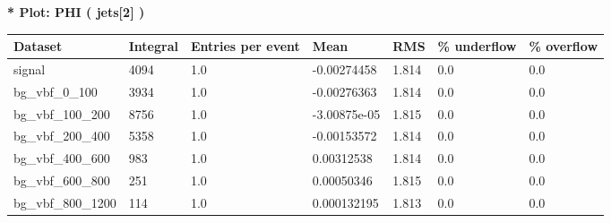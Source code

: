 \documentclass[a4paper, 10pt]{article}
\begin{document}
\textbf{* Plot: PHI ( jets[2] ) }\\
   \begin{table}[H]
  \begin{center}
    \begin{tabular}{|m{23.0mm}|m{23.0mm}|m{18.0mm}|m{19.0mm}|m{19.0mm}|m{19.0mm}|m{19.0mm}|}
      \hline
      {\cellcolor{yellow}         Dataset}& {\cellcolor{yellow}         Integral}& {\cellcolor{yellow}         Entries per event}& {\cellcolor{yellow}         Mean}& {\cellcolor{yellow}         RMS}& {\cellcolor{yellow}         \% underflow}& {\cellcolor{yellow}         \% overflow}\\
      \hline
      {\cellcolor{white}         signal}& {\cellcolor{white}         4094}& {\cellcolor{white}         1.0}& {\cellcolor{white}         -0.00274458}& {\cellcolor{white}         1.814}& {\cellcolor{green}         0.0}& {\cellcolor{green}         0.0}\\
      \hline
      {\cellcolor{white}         bg\_vbf\_0\_100}& {\cellcolor{white}         3934}& {\cellcolor{white}         1.0}& {\cellcolor{white}         -0.00276363}& {\cellcolor{white}         1.814}& {\cellcolor{green}         0.0}& {\cellcolor{green}         0.0}\\
      \hline
      {\cellcolor{white}         bg\_vbf\_100\_200}& {\cellcolor{white}         8756}& {\cellcolor{white}         1.0}& {\cellcolor{white}         -3.00875e-05}& {\cellcolor{white}         1.815}& {\cellcolor{green}         0.0}& {\cellcolor{green}         0.0}\\
      \hline
      {\cellcolor{white}         bg\_vbf\_200\_400}& {\cellcolor{white}         5358}& {\cellcolor{white}         1.0}& {\cellcolor{white}         -0.00153572}& {\cellcolor{white}         1.814}& {\cellcolor{green}         0.0}& {\cellcolor{green}         0.0}\\
      \hline
      {\cellcolor{white}         bg\_vbf\_400\_600}& {\cellcolor{white}         983}& {\cellcolor{white}         1.0}& {\cellcolor{white}         0.00312538}& {\cellcolor{white}         1.814}& {\cellcolor{green}         0.0}& {\cellcolor{green}         0.0}\\
      \hline
      {\cellcolor{white}         bg\_vbf\_600\_800}& {\cellcolor{white}         251}& {\cellcolor{white}         1.0}& {\cellcolor{white}         0.00050346}& {\cellcolor{white}         1.815}& {\cellcolor{green}         0.0}& {\cellcolor{green}         0.0}\\
      \hline
      {\cellcolor{white}         bg\_vbf\_800\_1200}& {\cellcolor{white}         114}& {\cellcolor{white}         1.0}& {\cellcolor{white}         0.000132195}& {\cellcolor{white}         1.813}& {\cellcolor{green}         0.0}& {\cellcolor{green}         0.0}\\

\end{tabular}
\end{center}
\end{table}
\end{document}
